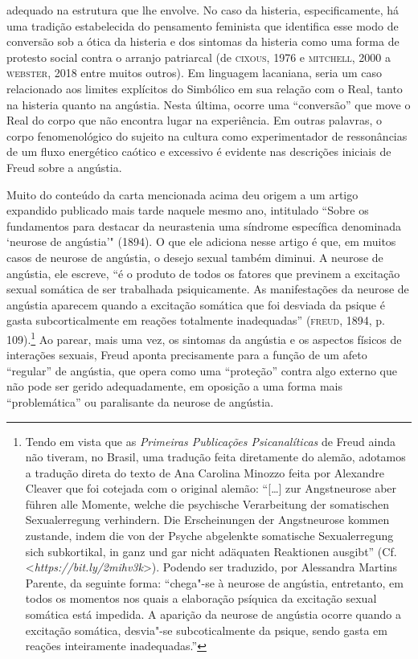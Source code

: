 adequado na estrutura que lhe envolve. No caso da histeria,
especificamente, há uma tradição estabelecida do pensamento feminista
que identifica esse modo de conversão sob a ótica da histeria e dos
sintomas da histeria como uma forma de protesto social contra o arranjo
patriarcal (de \textsc{cixous}, 1976 e \textsc{mitchell}, 2000 a \textsc{webster}, 2018 entre
muitos outros). Em linguagem lacaniana, seria um caso relacionado aos
limites explícitos do Simbólico em sua relação com o Real, tanto na
histeria quanto na angústia. Nesta última, ocorre uma ``conversão'' que
move o Real do corpo que não encontra lugar na experiência. Em outras
palavras, o corpo fenomenológico do sujeito na cultura como
experimentador de ressonâncias de um fluxo energético caótico e
excessivo é evidente nas descrições iniciais de Freud sobre a angústia.

Muito do conteúdo da carta mencionada acima deu origem a um artigo
expandido publicado mais tarde naquele mesmo ano, intitulado ``Sobre os
fundamentos para destacar da neurastenia uma síndrome específica
denominada `neurose de angústia'" (1894). O que ele adiciona nesse
artigo é que, em muitos casos de neurose de angústia, o desejo sexual
também diminui. A neurose de angústia, ele escreve, ``é o produto de
todos os fatores que previnem a excitação sexual somática de ser
trabalhada psiquicamente. As manifestações da neurose de angústia
aparecem quando a excitação somática que foi desviada da psique é gasta
subcorticalmente em reações totalmente inadequadas'' (\textsc{freud}, 1894, p.
109).\footnote{Tendo em vista que as \emph{Primeiras Publicações
  Psicanalíticas} de Freud ainda não tiveram, no Brasil, uma tradução
  feita diretamente do alemão, adotamos a tradução direta do texto de
  Ana Carolina Minozzo feita por Alexandre Cleaver que foi cotejada com
  o original alemão: ``{[}\ldots{}{]} zur Angstneurose aber führen alle
  Momente, welche die psychische Verarbeitung der somatischen
  Sexualerregung verhindern. Die Erscheinungen der Angstneurose kommen
  zustande, indem die von der Psyche abgelenkte somatische
  Sexualerregung sich subkortikal, in ganz und gar nicht adäquaten
  Reaktionen ausgibt'' (Cf. \textless{}\emph{https://bit.ly/2mihv3k}\textgreater{}).
  Podendo ser traduzido, por Alessandra Martins Parente, da seguinte forma:
  ``chega"-se à neurose de angústia, entretanto, em todos os momentos nos
  quais a elaboração psíquica da excitação sexual somática está
  impedida. A aparição da neurose de angústia ocorre quando a excitação
  somática, desvia"-se subcoticalmente da psique, sendo gasta em reações
  inteiramente inadequadas.''} Ao parear, mais uma vez, os sintomas da
angústia e os aspectos físicos de interações sexuais, Freud aponta
precisamente para a função de um afeto ``regular'' de angústia, que
opera como uma ``proteção'' contra algo externo que não pode ser gerido
adequadamente, em oposição a uma forma mais ``problemática'' ou
paralisante da neurose de angústia.

